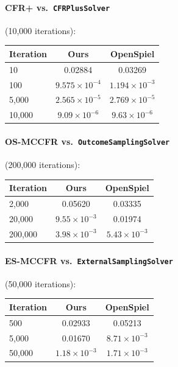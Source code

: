 \documentclass[11pt]{article}
\newcommand{\code}[1]{\texttt{#1}}
\begin{document}
\paragraph{CFR+ vs.\ \code{CFRPlusSolver}} (10{,}000 iterations):
\begin{center}
\begin{tabular}{lcc}
\toprule
Iteration & Ours & OpenSpiel \\
\midrule
10 & 0.02884 & 0.03269 \\
100 & $9.575\times10^{-4}$ & $1.194\times10^{-3}$ \\
5{,}000 & $2.565\times10^{-5}$ & $2.769\times10^{-5}$ \\
10{,}000 & $9.09\times10^{-6}$ & $9.63\times10^{-6}$ \\
\bottomrule
\end{tabular}
\end{center}

\paragraph{OS-MCCFR vs.\ \code{OutcomeSamplingSolver}} (200{,}000 iterations):
\begin{center}
\begin{tabular}{lcc}
\toprule
Iteration & Ours & OpenSpiel \\
\midrule
2{,}000 & 0.05620 & 0.03335 \\
20{,}000 & $9.55\times10^{-3}$ & 0.01974 \\
200{,}000 & $3.98\times10^{-3}$ & $5.43\times10^{-3}$ \\
\bottomrule
\end{tabular}
\end{center}

\paragraph{ES-MCCFR vs.\ \code{ExternalSamplingSolver}} (50{,}000 iterations):
\begin{center}
\begin{tabular}{lcc}
\toprule
Iteration & Ours & OpenSpiel \\
\midrule
500 & 0.02933 & 0.05213 \\
5{,}000 & 0.01670 & $8.71\times10^{-3}$ \\
50{,}000 & $1.18\times10^{-3}$ & $1.71\times10^{-3}$ \\
\bottomrule
\end{tabular}
\end{center}
\end{document}
